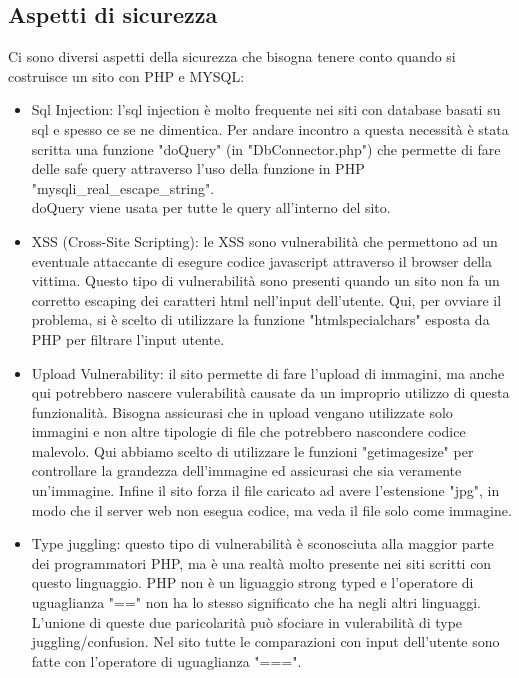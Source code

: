 \documentclass[openany, a4paper, 12pt]{report}
\begin{document}
		\subsection{Aspetti di sicurezza}
			Ci sono diversi aspetti della sicurezza che bisogna tenere conto quando si costruisce un sito con PHP e MYSQL:
			\begin{itemize}
				\item Sql Injection: l'sql injection è molto frequente nei siti con database basati su sql e spesso ce se ne dimentica. Per andare incontro a questa necessità è stata scritta una funzione "doQuery" (in "DbConnector.php") che permette di fare delle safe query attraverso l'uso della funzione in PHP "mysqli\_real\_escape\_string".\\
				doQuery viene usata per tutte le query all'interno del sito.

				\item XSS (Cross-Site Scripting): le XSS sono vulnerabilità che permettono ad un eventuale attaccante di esegure codice javascript attraverso il browser della vittima. Questo tipo di vulnerabilità sono presenti quando un sito non fa un corretto escaping dei caratteri html nell'input dell'utente. Qui, per ovviare il problema, si è scelto di utilizzare la funzione "htmlspecialchars" esposta da PHP per filtrare l'input utente.

				\item Upload Vulnerability: il sito permette di fare l'upload di immagini, ma anche qui potrebbero nascere vulerabilità causate da un improprio utilizzo di questa funzionalità. Bisogna assicurasi che in upload vengano utilizzate solo immagini e non altre tipologie di file che potrebbero nascondere codice malevolo. Qui abbiamo scelto di utilizzare le funzioni "getimagesize" per controllare la grandezza dell'immagine ed assicurasi che sia veramente un'immagine. Infine il sito forza il file caricato ad avere l'estensione "jpg", in modo che il server web non esegua codice, ma veda il file solo come immagine.

				\item Type juggling: questo tipo di vulnerabilità è sconosciuta alla maggior parte dei programmatori PHP, ma è una realtà molto presente nei siti scritti con questo linguaggio. PHP non è un liguaggio strong typed e l'operatore di uguaglianza "==" non ha lo stesso significato che ha negli altri linguaggi. L'unione di queste due paricolarità può sfociare in vulerabilità di type juggling/confusion. Nel sito tutte le comparazioni con input dell'utente sono fatte con l'operatore di uguaglianza "===".


\end{itemize}
\end{document}
